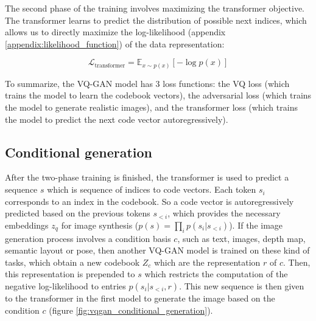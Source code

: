 
The second phase of the training involves maximizing the transformer objective. The transformer learns to predict the distribution of possible next indices, which allows us to directly maximize the log-likelihood (appendix \ref{appendix:likelihood_function}) of the data representation:

\begin{equation}
    \mathcal{L}_{\text{transformer}} = \mathbb{E}_{x \sim p(x)} [- \log p(x)]
\end{equation}

To summarize, the VQ-GAN model has 3 loss functions: the VQ loss (which trains the model to learn the codebook vectors), the adversarial loss (which trains the model to generate realistic images), and the transformer loss (which trains the model to predict the next code vector autoregressively).







\subsection{Conditional generation}

After the two-phase training is finished, the transformer is used to predict a sequence $s$ which is sequence of indices to code vectors. Each token $s_i$ corresponds to an index in the codebook. So a code vector is autoregressively predicted based on the previous tokens $s_{<i}$, which provides the necessary embeddings $z_q$ for image synthesis ($p(s) = \prod_{i} p(s_i | s_{<i})$). If the image generation process involves a condition basis $c$, such as text, images, depth map, semantic layout or pose, then another VQ-GAN model is trained on these kind of tasks, which obtain a new codebook $Z_c$ which are the representation $r$ of $c$. Then, this representation is prepended to $s$ which restricts the computation of the negative log-likelihood to entries $p(s_i | s_{<i}, r)$. This new sequence is then given to the transformer in the first model to generate the image based on the condition $c$ (figure \ref{fig:vqgan_conditional_generation}).


